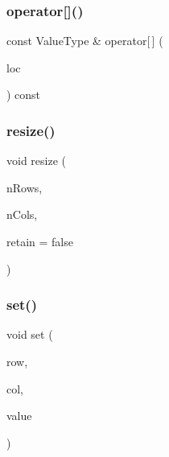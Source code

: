 \mbox{\label{classSparseGrid_a914315640e381831ab30403063205359}} 
\subsubsection{\texorpdfstring{operator[]()}{operator[]()}\hspace{0.1cm}{\footnotesize\ttfamily [4/4]}}
{\footnotesize\ttfamily const Value\+Type \& operator\mbox{[}$\,$\mbox{]} (\begin{DoxyParamCaption}\item[{const \mbox{\hyperlink{structGridLocation}{Grid\+Location}} \&}]{loc }\end{DoxyParamCaption}) const}

\mbox{\label{classSparseGrid_ace38e4e9ed81ae4ec651e4db9ab09db0}} 
\subsubsection{\texorpdfstring{resize()}{resize()}}
{\footnotesize\ttfamily void resize (\begin{DoxyParamCaption}\item[{int}]{n\+Rows,  }\item[{int}]{n\+Cols,  }\item[{bool}]{retain = {\ttfamily false} }\end{DoxyParamCaption})}

\mbox{\label{classSparseGrid_a6f5cee26d171f36d280a15c51332efc2}} 
\subsubsection{\texorpdfstring{set()}{set()}\hspace{0.1cm}{\footnotesize\ttfamily [1/2]}}
{\footnotesize\ttfamily void set (\begin{DoxyParamCaption}\item[{int}]{row,  }\item[{int}]{col,  }\item[{const Value\+Type \&}]{value }\end{DoxyParamCaption})}

